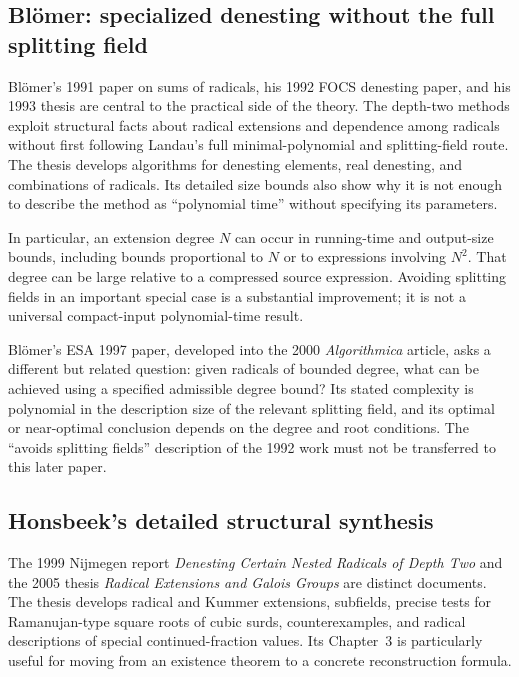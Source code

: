 \documentclass[11pt,a4paper]{article}
\theoremstyle{definition}
\theoremstyle{remark}
\numberwithin{equation}{section}
\begin{document}
\subsection{Bl\"omer: specialized denesting without the full splitting field}

Bl\"omer's 1991 paper on sums of radicals, his 1992 FOCS denesting paper, and his 1993 thesis are central to the practical side of the theory. The depth-two methods exploit structural facts about radical extensions and dependence among radicals without first following Landau's full minimal-polynomial and splitting-field route. The thesis develops algorithms for denesting elements, real denesting, and combinations of radicals. Its detailed size bounds also show why it is not enough to describe the method as ``polynomial time'' without specifying its parameters.\cite{blomer1991,blomer1992,blomerthesis}

In particular, an extension degree $N$ can occur in running-time and output-size bounds, including bounds proportional to $N$ or to expressions involving $N^2$. That degree can be large relative to a compressed source expression. Avoiding splitting fields in an important special case is a substantial improvement; it is not a universal compact-input polynomial-time result.

Bl\"omer's ESA 1997 paper, developed into the 2000 \emph{Algorithmica} article, asks a different but related question: given radicals of bounded degree, what can be achieved using a specified admissible degree bound? Its stated complexity is polynomial in the description size of the relevant splitting field, and its optimal or near-optimal conclusion depends on the degree and root conditions. The ``avoids splitting fields'' description of the 1992 work must not be transferred to this later paper.\cite{blomer2000}

\subsection{Honsbeek's detailed structural synthesis}

The 1999 Nijmegen report \emph{Denesting Certain Nested Radicals of Depth Two} and the 2005 thesis \emph{Radical Extensions and Galois Groups} are distinct documents. The thesis develops radical and Kummer extensions, subfields, precise tests for Ramanujan-type square roots of cubic surds, counterexamples, and radical descriptions of special continued-fraction values. Its Chapter~3 is particularly useful for moving from an existence theorem to a concrete reconstruction formula.\cite{honsbeek1999,honsbeek2005}
\end{document}
